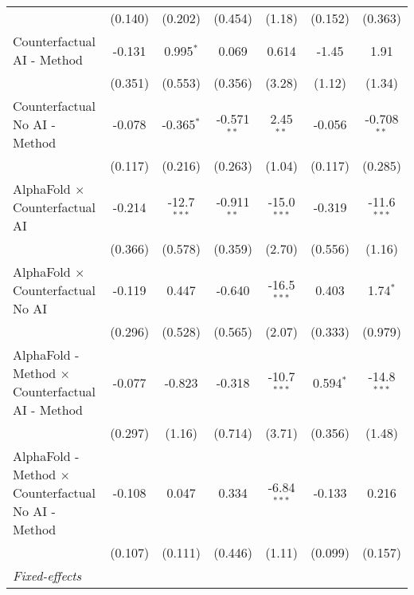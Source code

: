 \begin{tabular}{lcccccc}
                                                              & (0.140)      & (0.202)       & (0.454)       & (1.18)        & (0.152)       & (0.363)\\   
   Counterfactual AI - Method                                 & -0.131       & 0.995$^{*}$   & 0.069         & 0.614         & -1.45         & 1.91\\   
                                                              & (0.351)      & (0.553)       & (0.356)       & (3.28)        & (1.12)        & (1.34)\\   
   Counterfactual No AI - Method                              & -0.078       & -0.365$^{*}$  & -0.571$^{**}$ & 2.45$^{**}$   & -0.056        & -0.708$^{**}$\\   
                                                              & (0.117)      & (0.216)       & (0.263)       & (1.04)        & (0.117)       & (0.285)\\   
   AlphaFold $\times$ Counterfactual AI                       & -0.214       & -12.7$^{***}$ & -0.911$^{**}$ & -15.0$^{***}$ & -0.319        & -11.6$^{***}$\\   
                                                              & (0.366)      & (0.578)       & (0.359)       & (2.70)        & (0.556)       & (1.16)\\   
   AlphaFold $\times$ Counterfactual No AI                    & -0.119       & 0.447         & -0.640        & -16.5$^{***}$ & 0.403         & 1.74$^{*}$\\   
                                                              & (0.296)      & (0.528)       & (0.565)       & (2.07)        & (0.333)       & (0.979)\\   
   AlphaFold - Method $\times$ Counterfactual AI - Method     & -0.077       & -0.823        & -0.318        & -10.7$^{***}$ & 0.594$^{*}$   & -14.8$^{***}$\\   
                                                              & (0.297)      & (1.16)        & (0.714)       & (3.71)        & (0.356)       & (1.48)\\   
   AlphaFold - Method $\times$ Counterfactual No AI - Method  & -0.108       & 0.047         & 0.334         & -6.84$^{***}$ & -0.133        & 0.216\\   
                                                              & (0.107)      & (0.111)       & (0.446)       & (1.11)        & (0.099)       & (0.157)\\   
   \midrule
   \emph{Fixed-effects}\\

\end{tabular}
